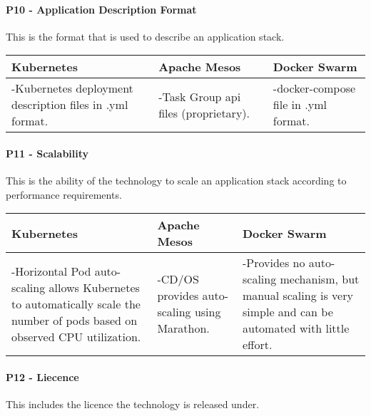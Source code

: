 \paragraph{P10 - Application Description Format}

This is the format that is used to describe an application stack.

\begin{center}
  \begin{tabular}{ | p{4.5cm} | p{4.5cm} | p{4.5cm} | }
    \hline
    \textbf{Kubernetes}&\textbf{Apache Mesos}&\textbf{Docker Swarm}\\\hline
    -Kubernetes deployment description files in .yml format. & 
    
    -Task Group \gls{api} files (proprietary). & 
    
    -docker-compose file in .yml format. \\
    \hline
  \end{tabular}
\end{center}

\paragraph{P11 - Scalability}

This is the ability of the technology to scale an application stack according to
performance requirements.

\begin{center}
  \begin{tabular}{ | p{4.5cm} | p{4.5cm} | p{4.5cm} | }
    \hline
    \textbf{Kubernetes}&\textbf{Apache Mesos}&\textbf{Docker Swarm}\\\hline
    -Horizontal Pod auto-scaling allows Kubernetes to automatically scale the
    number of pods based on observed CPU utilization. & 
    
    -CD/OS provides auto-scaling using Marathon. & 
    
    -Provides no auto-scaling mechanism, but manual scaling is very simple and
    can be automated with little effort.
    \\
    \hline
  \end{tabular}
\end{center}

\paragraph{P12 - Liecence}

This includes the licence the technology is released under.

